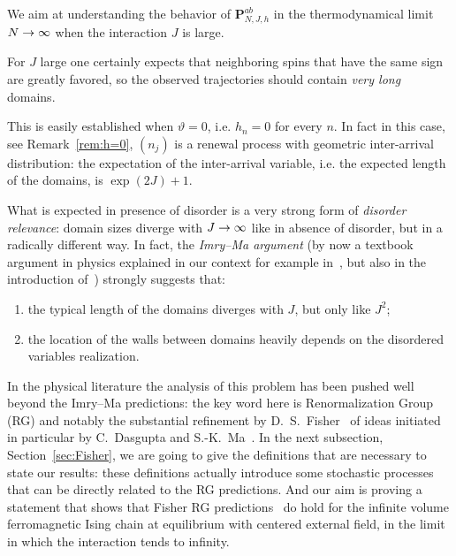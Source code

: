 \documentclass[AHL,Unicode,longabstracts,published]{cedram}
\newcommand{\bP}{\mathbf{P}}
\renewcommand*{\to}{\mathchoice{\longrightarrow}{\rightarrow}{\rightarrow}{\rightarrow}}
\begin{document}
We aim at understanding the behavior of $\bP^{ab}_{N, J, h}$ in the thermodynamical limit $N \to \infty$ when the interaction $J$ is large.

For $J$ large one certainly expects that neighboring spins that have the same sign are greatly favored, so the observed trajectories should contain \emph{very long} domains.

This is easily established when $\vartheta =0$, i.e. $h_n=0$ for every $n$. In fact in this case, see Remark~\ref{rem:h=0}, $(n_j)$ is a renewal process with geometric inter-arrival distribution: the expectation of the inter-arrival variable, i.e. the expected length of the domains, is $\exp(2J)+1$.


What is expected in presence of disorder is a very strong form of \emph{disorder relevance}: domain sizes diverge with $J\to \infty$ like in absence of disorder, but in a radically different way. In fact, the \emph{Imry--Ma argument} (by now a textbook argument in physics explained in our context for example in~\cite[p.~373]{cf:IM}, but also in the introduction of~\cite{cf:CGH1}) strongly suggests that:
\begin{enumerate}
\item the typical length of the domains diverges with $J$, but only like $J^2$;
\item the location of the walls between domains heavily depends on the disordered variables realization.
\end{enumerate}

In the physical literature the analysis of this problem has been pushed well beyond the Imry--Ma predictions: the key word here is Renormalization Group (RG) and notably the substantial refinement by D.~S.~Fisher~\cite{cf:F92,cf:F95} of ideas initiated in particular by C.~Dasgupta and S.-K.~Ma~\cite{DM}. In the next subsection, Section~\ref{sec:Fisher}, we are going to give the definitions that are necessary to state our results: these definitions actually introduce some stochastic processes that can be directly related to the RG predictions. And our aim is proving a statement that shows that Fisher RG predictions~\cite{cf:FLDM01} do hold for the infinite volume ferromagnetic Ising chain at equilibrium with centered external field, in the limit in which the interaction tends to infinity.
\end{document}
